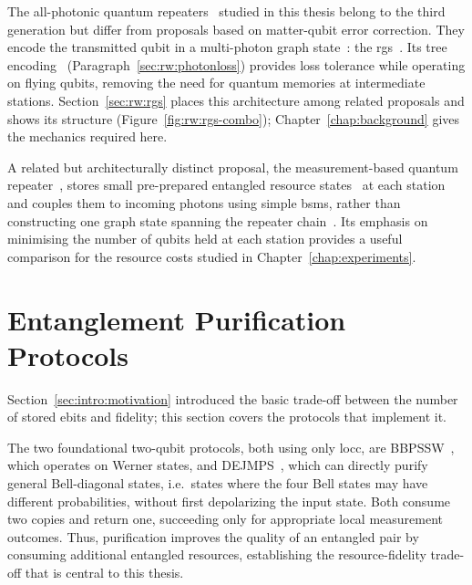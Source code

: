 The all-photonic quantum repeaters~\cite{Azuma2015All} studied in this thesis belong to the third generation but differ from proposals based on matter-qubit error correction. They encode the transmitted qubit in a multi-photon graph state~\cite{Briegel2001Persistent,Hein2006Entanglement,Hein2004Multiparty}: the \Gls{rgs}~\cite{Azuma2015All}. Its tree encoding~\cite{Varnava2006Loss,Varnava2007Loss} (Paragraph~\ref{sec:rw:photonloss}) provides loss tolerance while operating on flying qubits, removing the need for quantum memories at intermediate stations. Section~\ref{sec:rw:rgs} places this architecture among related proposals and shows its structure (Figure~\ref{fig:rw:rgs-combo}); Chapter~\ref{chap:background} gives the mechanics required here.

A related but architecturally distinct proposal, the measurement-based quantum repeater~\cite{Zwerger2012Measurementbased}, stores small pre-prepared entangled resource states~\cite{Raussendorf2002oneway,Raussendorf2002Computational,Raussendorf2003Measurementbased,Nielsen2006Clusterstate,Greenberger2009Compendium} at each station and couples them to incoming photons using simple \Glspl{bsm}, rather than constructing one graph state spanning the repeater chain~\cite{Browne2005Resourceefficient,Ewert20143,Zwerger2018Longrange}. Its emphasis on minimising the number of qubits held at each station provides a useful comparison for the resource costs studied in Chapter~\ref{chap:experiments}.

\section{Entanglement Purification Protocols}
\label{sec:rw:purification}

Section~\ref{sec:intro:motivation} introduced the basic trade-off between the number of stored ebits and fidelity; this section covers the protocols that implement it.

The two foundational two-qubit protocols, both using only \gls{locc}, are BBPSSW~\cite{Bennett1996Purification}, which operates on Werner states, and DEJMPS~\cite{Deutsch1996Quantum}, which can directly purify general Bell-diagonal states, i.e.\ states where the four Bell states may have different probabilities, without first depolarizing the input state. Both consume two copies and return one, succeeding only for appropriate local measurement outcomes. Thus, purification improves the quality of an entangled pair by consuming additional entangled resources, establishing the resource-fidelity trade-off that is central to this thesis.

